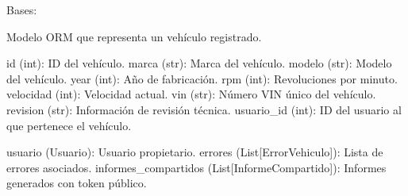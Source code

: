 \documentclass[letterpaper,10pt,spanish]{sphinxmanual}
\begin{document}

\begin{fulllineitems}
\label{\detokenize{endpoints:main.Vehiculo}}
\pysigstartsignatures
\pysiglinewithargsret
{}
{}
{}
\pysigstopsignatures
\sphinxAtStartPar
Bases: {\hyperref[\detokenize{modelos:main.Base}]{}}

\sphinxAtStartPar
Modelo ORM que representa un vehículo registrado.
\begin{description}
\sphinxAtStartPar
id (int): ID del vehículo.
marca (str): Marca del vehículo.
modelo (str): Modelo del vehículo.
year (int): Año de fabricación.
rpm (int): Revoluciones por minuto.
velocidad (int): Velocidad actual.
vin (str): Número VIN único del vehículo.
revision (str): Información de revisión técnica.
usuario\_id (int): ID del usuario al que pertenece el vehículo.

\sphinxAtStartPar
usuario (Usuario): Usuario propietario.
errores (List{[}ErrorVehiculo{]}): Lista de errores asociados.
informes\_compartidos (List{[}InformeCompartido{]}): Informes generados con token público.

\end{description}

\begin{fulllineitems}
\label{\detokenize{endpoints:main.Vehiculo.errores}}
\pysigstartsignatures
\pysigline
{}
\pysigstopsignatures
\end{fulllineitems}


\begin{fulllineitems}
\label{\detokenize{endpoints:main.Vehiculo.id}}
\pysigstartsignatures
\pysigline
{}
\pysigstopsignatures
\end{fulllineitems}



\end{fulllineitems}
\end{document}
